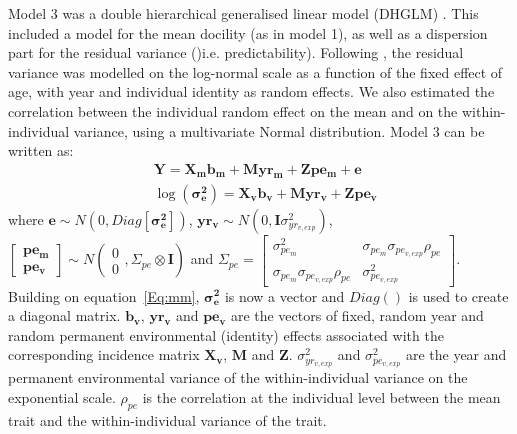 \documentclass[a4paper,12pt,twoside]{article}
\begin{document}
	Model 3 was a double hierarchical generalised linear model (DHGLM) \citep{Lee2006,Cleasby2015}.
	This included a model for the mean docility (as in model 1), as well as a dispersion part for the residual variance ()i.e. predictability).
	Following \cite{Sancristobal-gaudy1998}, the residual variance was modelled on the log-normal scale as a function of the fixed effect of age, with year and individual identity as random effects.
	We also estimated the correlation between the individual random effect on the mean and on the within-individual variance, using a multivariate Normal distribution.
	Model 3 can be written as:
	\begin{equation}\label{Eq:dhm}
		\begin{aligned}
			&\boldsymbol{Y} = \boldsymbol{X_m b_m} + \boldsymbol{M yr_m} + \boldsymbol{Z pe_m} + \boldsymbol{e}\\
			&\log (\boldsymbol{\sigma_e^2}) = \boldsymbol{X_v b_v} + \boldsymbol{M yr_v} + \boldsymbol{Z pe_v}
		\end{aligned}
	\end{equation}
	where $\boldsymbol{e} \sim N \left(0, Diag [ \boldsymbol{\sigma_e^2}] \right) $, $\boldsymbol{yr_v} \sim N \left( 0, \boldsymbol{I}\sigma_{yr_{v,exp}}^2 \right) $, 
	$\begin{bmatrix}
		\boldsymbol{pe_m} \\
		\boldsymbol{pe_v}
	\end{bmatrix}
	\sim N \left(\begin{matrix} 0 \\ 0 \end{matrix}, \Sigma_{pe} \otimes \boldsymbol{I} \right)$
	and
	$\Sigma_{pe} =
	\begin{bmatrix}
		\sigma_{pe_m}^2 & \sigma_{pe_m}\sigma_{pe_{v,exp}}\rho_{pe} \\
		\sigma_{pe_m}\sigma_{pe_{v,exp}}\rho_{pe} & \sigma_{pe_{v,exp}}^2 
	\end{bmatrix}
	$.
	Building on equation~\ref{Eq:mm}, $\boldsymbol{\sigma_e^2}$ is now a vector and $Diag()$ is used to create a diagonal matrix.
	$\boldsymbol{b_v}$, $\boldsymbol{yr_v}$ and $\boldsymbol{pe_v}$ are the vectors of fixed, random year and random permanent environmental (identity) effects associated with the corresponding incidence matrix $\boldsymbol{X_v}$, $\boldsymbol{M}$ and $\boldsymbol{Z}$.
	$\sigma_{yr_{v,exp}}^2$ and $\sigma_{pe_{v,exp}}^2$ are the year and permanent environmental variance of the within-individual variance on the exponential scale.
	$\rho_{pe}$ is the correlation at the individual level between the mean trait and the within-individual variance of the trait.
	
\end{document}
